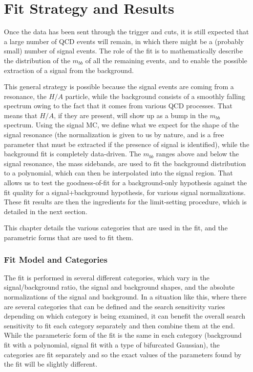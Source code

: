  

\chapter[Fit Strategy and Results]{Fit Strategy and Results}

Once the data has been sent through the trigger and cuts, it is still expected
that a large number of QCD events will remain, in which there might be a (probably small)
number of signal events.  The role of the fit is to mathematically describe
the distribution of the $m_{bb}$ of all the remaining events, and to enable the
possible extraction of a signal from the background.  

This general strategy is possible because the signal events are coming from a 
resonance, the $H/A$ particle, while the background consists of a smoothly 
falling spectrum owing to the fact that it comes from various QCD processes.
That means that $H/A$, if they are present, will show up as a bump in the $m_{bb}$
spectrum.  Using the signal MC, we define what we expect for the shape of
the signal resonance (the normalization is given to us by nature, and 
is a free parameter that must be extracted if the presence of signal is identified),
while the background fit is completely data-driven.  The $m_{bb}$ ranges above
and below the signal resonance, the mass sidebands, are used to 
fit the background distribution to a polynomial, which can then be interpolated
into the signal region.  That allows us to test the goodness-of-fit for a 
background-only hypothesis against the fit quality for a signal+background
hypothesis, for various signal normalizations.  These fit results are then
the ingredients for the limit-setting procedure, which is detailed in the next section.

This chapter details the various categories that are used in the fit, and
the parametric forms that are used to fit them.   

\subsection{Fit Model and Categories}
\label{subsec:fitmodel}
The fit is performed in several different categories, which vary in the 
signal/background ratio, the signal and background shapes, and the
absolute normalizations of the signal and background.  In a situation like
this, where there are several categories that can be defined and the
search sensitivity varies depending on which category is being examined,
it can benefit the overall search sensitivity to fit each category 
separately and then combine them at the end.  While the parameteric form
of the fit is the same in each category (background fit with a polynomial, 
signal fit with a type of bifurcated Gaussian), the categories are fit
separately and so the exact values of the parameters found by the fit
will be slightly different.  


